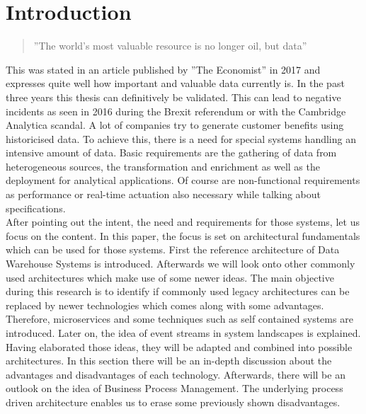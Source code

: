 \section{Introduction}
\label{sec:intro}
\begin{quote}
    ''The world’s most valuable resource is no longer oil, but data'' \cite{dataIsOil}
\end{quote}
This was stated in an article published by ''The Economist'' in 2017 and expresses quite well how important and valuable data currently is. In the past three years this thesis can definitively be validated. This can lead to negative incidents as seen in 2016 during the Brexit referendum or with the Cambridge Analytica scandal. A lot of companies try to generate customer benefits using historicised data.\newline
To achieve this, there is a need for special systems handling an intensive amount of data. Basic requirements are the gathering of data from heterogeneous sources, the transformation and enrichment as well as the deployment for analytical applications. Of course are non-functional requirements as performance or real-time actuation also necessary while talking about specifications.\newline
\\
After pointing out the intent, the need and requirements for those systems, let us focus on the content. In this paper, the focus is set on architectural fundamentals which can be used for those systems. First the reference architecture of Data Warehouse Systems is introduced. Afterwards we will look onto other commonly used architectures which make use of some newer ideas.
The main objective during this research is to identify if commonly used legacy architectures can be replaced by newer technologies which comes along with some advantages.
\newline
Therefore, microservices and some techniques such as self contained systems are introduced. Later on, the idea of event streams in system landscapes is explained.\newline
Having elaborated those ideas, they will be adapted and combined into possible architectures. In this section there will be an in-depth discussion about the advantages and disadvantages of each technology.\newline
Afterwards, there will be an outlook on the idea of Business Process Management. The underlying process driven architecture enables us to erase some previously shown disadvantages.\newline
